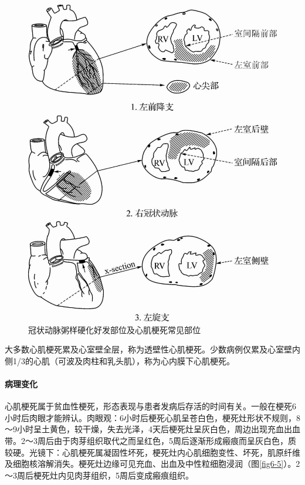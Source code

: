 \begin{figure}[!htbp]
    \centering
    \includegraphics{./images/Image00096.jpg}
    \captionsetup{justification=centering}
    \caption{冠状动脉粥样硬化好发部位及心肌梗死常见部位}
    \label{fig6-4}
\end{figure}

大多数心肌梗死累及心室壁全层，称为透壁性心肌梗死。少数病例仅累及心室壁内侧1/3的心肌（可波及肉柱和乳头肌），称为心内膜下心肌梗死。

\paragraph{病理变化}
心肌梗死属于贫血性梗死，形态表现与患者发病后存活的时间有关。一般在梗死6小时后肉眼才能辨认。肉眼观：6小时后梗死心肌呈苍白色，梗死灶形状不规则，8～9小时呈土黄色，较干燥，失去光泽，4天后梗死灶呈灰白色，周边出现充血出血带。2～3周后由于肉芽组织取代之而呈红色，5周后逐渐形成瘢痕而呈灰白色，质较硬。光镜下：心肌梗死属凝固性坏死，梗死灶内心肌细胞变性、坏死，肌原纤维及细胞核溶解消失。梗死灶边缘可见充血、出血及中性粒细胞浸润（图\ref{fig6-5}）。2～3周后梗死灶内见肉芽组织，5周后变成瘢痕组织。

